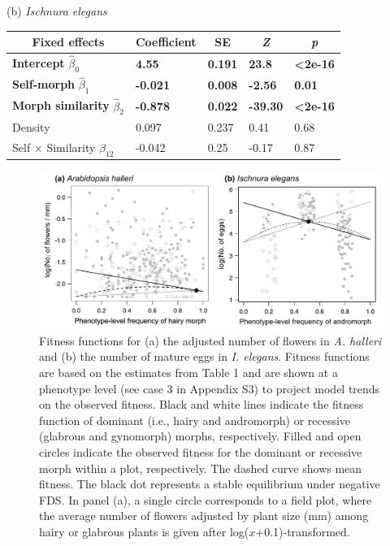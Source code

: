 \documentclass[12pt,]{article}
\begin{document}
\begin{table}[ht]
(b) \textit{Ischnura elegans} \\
\begin{tabular}{lllll}
\hline
\multicolumn{1}{c}{Fixed   effects} & \multicolumn{1}{c}{Coefficient} & \multicolumn{1}{c}{SE} & \multicolumn{1}{c}{\textit{Z}} & \multicolumn{1}{c}{\textit{p}} \\ \hline
\textbf{Intercept} $\hat{\beta}_{0}$    & \textbf{4.55} &  \textbf{0.191} & \textbf{23.8}  & \textbf{\textless{}2e-16}  \\
\textbf{Self-morph} $\hat{\beta}_{1}$               & \textbf{-0.021}                 & \textbf{0.008}         & \textbf{-2.56}                 & \textbf{0.01}                  \\
\textbf{Morph similarity} $\hat{\beta}_{2}$           & \textbf{-0.878}                 & \textbf{0.022}         & \textbf{-39.30}                & \textbf{\textless{}2e-16}      \\
Density                             & 0.097                           & 0.237                  & 0.41                           & 0.68                           \\
Self $\times$ Similarity $\hat{\beta}_{12}$                 & -0.042                          & 0.25                 & -0.17                          & 0.87                           \\ \hline
\end{tabular}
\label{table1:GLMM}
\end{table}

\begin{figure}[ht]
  \includegraphics[width=\linewidth]{Fig4_Ah_le_plots.pdf}
  \caption{Fitness functions for (a) the adjusted number of flowers in \textit{A. halleri} and (b) the number of mature eggs in \textit{I. elegans}. Fitness functions are based on the estimates from Table 1 and are shown at a phenotype level (see case 3 in Appendix S3) to project model trends on the observed fitness. Black and white lines indicate the fitness function of dominant (i.e., hairy and andromorph) or recessive (glabrous and gynomorph) morphs, respectively. Filled and open circles indicate the observed fitness for the dominant or recessive morph within a plot, respectively. The dashed curve shows mean fitness. The black dot represents a stable equilibrium under negative FDS. In panel (a), a single circle corresponds to a field plot, where the average number of flowers adjusted by plant size (mm) among hairy or glabrous plants is given after log($x$+0.1)-transformed.}
  \label{fig4:GLMM}
\end{figure}
\end{document}
